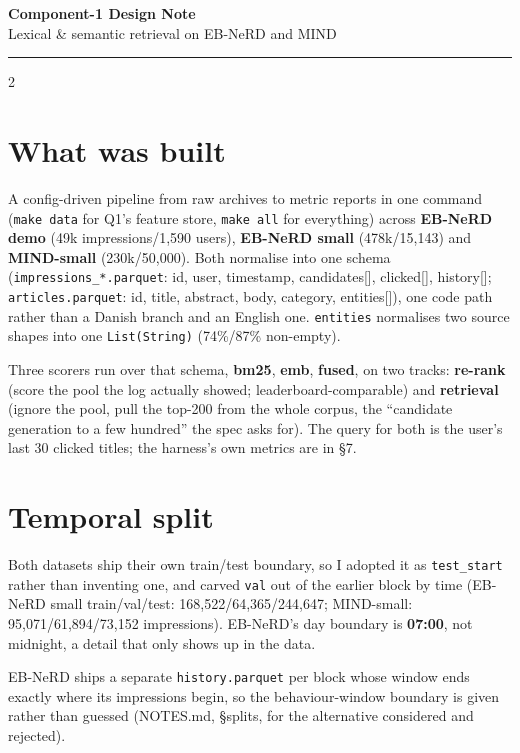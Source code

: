 \documentclass[10pt,a4paper]{article}
\begin{document}
\begin{center}
  {\large\bfseries Component-1 Design Note}\\[0.3ex]
  {\small Lexical \& semantic retrieval on EB-NeRD and MIND}
\end{center}
\vspace{-0.5ex}
\hrule
\vspace{1ex}

\begin{multicols}{2}

\section{What was built}

A config-driven pipeline from raw archives to metric reports in one command (\texttt{make data} for
Q1's feature store, \texttt{make all} for everything) across \textbf{EB-NeRD demo}
(49k impressions/1,590 users), \textbf{EB-NeRD small} (478k/15,143) and \textbf{MIND-small}
(230k/50,000). Both normalise into one schema (\texttt{impressions\_*.parquet}: id, user, timestamp,
candidates[], clicked[], history[]; \texttt{articles.parquet}: id, title, abstract, body, category,
entities[]), one code path rather than a Danish branch and an English one. \texttt{entities}
normalises two source shapes into one \texttt{List(String)} (74\%/87\% non-empty).

Three scorers run over that schema, \textbf{bm25}, \textbf{emb}, \textbf{fused}, on two tracks:
\textbf{re-rank} (score the pool the log actually showed; leaderboard-comparable) and
\textbf{retrieval} (ignore the pool, pull the top-200 from the whole corpus, the ``candidate
generation to a few hundred'' the spec asks for). The query for both is the user's last 30 clicked
titles; the harness's own metrics are in \S7.

\section{Temporal split}

Both datasets ship their own train/test boundary, so I adopted it as \texttt{test\_start} rather than
inventing one, and carved \texttt{val} out of the earlier block by time (EB-NeRD small
train/val/test: 168,522/64,365/244,647; MIND-small: 95,071/61,894/73,152 impressions). EB-NeRD's day
boundary is \textbf{07:00}, not midnight, a detail that only shows up in the data.

EB-NeRD ships a separate \texttt{history.parquet} per block whose window ends exactly where its
impressions begin, so the behaviour-window boundary is given rather than guessed (NOTES.md,
\S splits, for the alternative considered and rejected).


\end{multicols}
\end{document}
